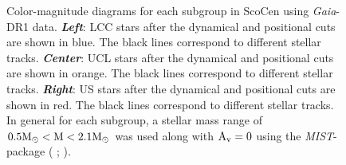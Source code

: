 \begin{figure}[!ht]
\centering
\caption{\scriptsize{Color-magnitude diagrams for each subgroup in ScoCen using \textit{Gaia}-DR1 data. \textit{\textbf{Left}}: LCC stars after the dynamical and positional cuts are shown in blue. The black lines correspond to different stellar tracks. \textit{\textbf{\textbf{Center}}}: UCL stars after the dynamical and positional cuts are shown in orange. The black lines correspond to different stellar tracks. \textit{\textbf{Right}}: US stars after the dynamical and positional cuts are shown in red. The black lines correspond to different stellar tracks. In general for each subgroup, a stellar mass range of $0.5 \textnormal{M}_\odot < \textnormal{M} < 2.1 \textnormal{M}_\odot$ was used along with $\textnormal{A}_\textnormal{v} = 0$ using the \textit{MIST}-package ( \citeyear{2016ApJS..222....8D};  \citeyear{2016ApJ...823..102C}).}}
\label{fig:Stellar_Tracks_1_appendix}
\end{figure}

